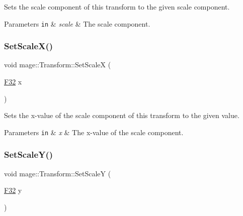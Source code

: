Sets the scale component of this transform to the given scale component.


\begin{DoxyParams}[1]{Parameters}
\mbox{\tt in}  & {\em scale} & The scale component. \\
\hline
\end{DoxyParams}
\hypertarget{classmage_1_1_transform_a6adbe2205f8db80107a2046eb7a9566a}{}\label{classmage_1_1_transform_a6adbe2205f8db80107a2046eb7a9566a} 
\subsubsection{\texorpdfstring{Set\+Scale\+X()}{SetScaleX()}}
{\footnotesize\ttfamily void mage\+::\+Transform\+::\+Set\+ScaleX (\begin{DoxyParamCaption}\item[{\hyperlink{namespacemage_aa97e833b45f06d60a0a9c4fc22ae02c0}{F32}}]{x }\end{DoxyParamCaption})\hspace{0.3cm}{\ttfamily [noexcept]}}

Sets the x-\/value of the scale component of this transform to the given value.


\begin{DoxyParams}[1]{Parameters}
\mbox{\tt in}  & {\em x} & The x-\/value of the scale component. \\
\hline
\end{DoxyParams}
\hypertarget{classmage_1_1_transform_a953a89b7f7ed2ec47eb05074d43e35c6}{}\label{classmage_1_1_transform_a953a89b7f7ed2ec47eb05074d43e35c6} 
\subsubsection{\texorpdfstring{Set\+Scale\+Y()}{SetScaleY()}}
{\footnotesize\ttfamily void mage\+::\+Transform\+::\+Set\+ScaleY (\begin{DoxyParamCaption}\item[{\hyperlink{namespacemage_aa97e833b45f06d60a0a9c4fc22ae02c0}{F32}}]{y }\end{DoxyParamCaption})\hspace{0.3cm}{\ttfamily [noexcept]}}

